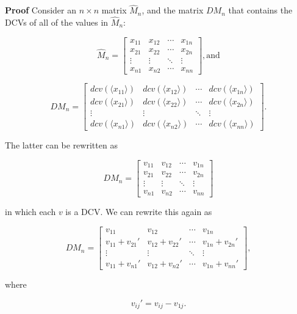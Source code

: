 \documentclass[10pt,letterpaper]{article}
\newenvironment{proof}{\noindent\textbf{Proof} }{\qed \newline}
\newcommand{\qed}{\nobreak \ifvmode \relax \else
      \ifdim\lastskip<1.5em \hskip-\lastskip
      \hskip1.5em plus0em minus0.5em \fi \nobreak
      \vrule height0.75em width0.5em depth0.25em\fi}
\numberwithin{equation}{section}
\begin{document}
\begin{proof}Consider an $n \times n$ matrix $\hat M_n$, and the matrix
  $DM_n$ that contains the DCVs of all of the values in $\hat M_n$:

\[ \hat M_n = \left[ \begin{matrix} 
  x_{11} & x_{12} & \cdots & x_{1n} \\
  x_{21} & x_{22} & \cdots & x_{2n} \\
  \vdots & \vdots & \ddots & \vdots \\
  x_{n1} & x_{n2} & \cdots & x_{nn}
 \end{matrix} \right] , \mbox{and} \]

\[ DM_n = \left[ \begin{matrix} 
  dcv(\langle x_{11} \rangle) & dcv(\langle x_{12} \rangle) & \cdots & dcv(\langle x_{1n} \rangle) \\
  dcv(\langle x_{21} \rangle) & dcv(\langle x_{22} \rangle) & \cdots & dcv(\langle x_{2n} \rangle) \\
  \vdots & \vdots & \ddots & \vdots \\
  dcv(\langle x_{n1} \rangle) & dcv(\langle x_{n2} \rangle) & \cdots & dcv(\langle x_{nn} \rangle)
 \end{matrix} \right] . \]

The latter can be rewritten as

\[ DM_n = \left[ \begin{matrix} 
  v_{11} & v_{12} & \cdots & v_{1n} \\
  v_{21} & v_{22} & \cdots & v_{2n} \\
  \vdots & \vdots & \ddots & \vdots \\
  v_{n1} & v_{n2} & \cdots & v_{nn}
 \end{matrix} \right] \]

in which each $v$ is a DCV.  We can rewrite this again as

\[ DM_n = \left[ \begin{matrix} 
  v_{11} & v_{12} & \cdots & v_{1n} \\
  v_{11} + v_{21} \prime & v_{12} + v_{22} \prime & \cdots & v_{1n} + v_{2n} \prime \\
  \vdots & \vdots & \ddots & \vdots \\
  v_{11} + v_{n1} \prime & v_{12} + v_{n2} \prime & \cdots & v_{1n} + v_{nn} \prime
 \end{matrix} \right] , \]

where

\[ v_{ij} \prime = v_{ij} - v_{1j} . \]


\end{proof}
\end{document}

